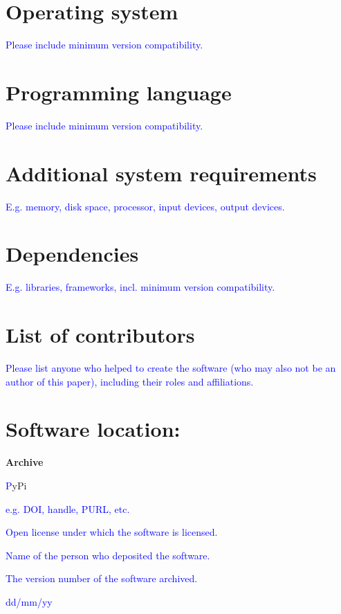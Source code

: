 \documentclass{jors}
\begin{document}
\section*{Operating system}

\textcolor{blue}{Please include minimum version compatibility.}

\section*{Programming language}

\textcolor{blue}{Please include minimum version compatibility.}

\section*{Additional system requirements}

\textcolor{blue}{E.g. memory, disk space, processor, input devices, output devices.}

\section*{Dependencies}

\textcolor{blue}{E.g. libraries, frameworks, incl. minimum version compatibility.}

\section*{List of contributors}

\textcolor{blue}{Please list anyone who helped to create the software (who may also not be an author of this paper), including their roles and affiliations.}

\section*{Software location:}

{\bf Archive}

\begin{description}[noitemsep,topsep=0pt]
	\item[Name:] \textcolor{blue}PyPi
	\item[Persistent identifier:] \textcolor{blue}{e.g. DOI, handle, PURL, etc.}
	\item[Licence:] \textcolor{blue}{Open license under which the software is licensed.}
	\item[Publisher:]  \textcolor{blue}{Name of the person who deposited the software.}
	\item[Version published:] \textcolor{blue}{The version number of the software archived.}
	\item[Date published:] \textcolor{blue}{dd/mm/yy}
\end{description}
\end{document}
